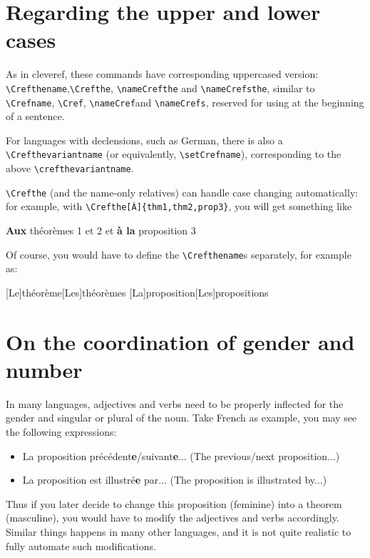 \documentclass[classical]{einfart}
\newenvironment{demo}
  {%
    \LocallyStopLineNumbers%
    \begin{tcolorbox}[enhanced jigsaw,pad at break*=1mm,breakable,
        left=2.5mm,right=3mm,top=0.5mm,bottom=0mm,
        colback=gray!5!paper,boxrule=0pt,frame hidden,
        borderline west={1.2mm}{0mm}{gray!55!paper},arc=.7mm]%
  }
  {%
    \end{tcolorbox}%
    \ResumeLineNumbers%
  }
\begin{document}
\section{Regarding the upper and lower cases}

As in \textsf{cleveref}, these commands have corresponding uppercased version: \lstinline|\Crefthename|,\linebreak \lstinline|\Crefthe|, \lstinline|\nameCrefthe| and \lstinline|\nameCrefsthe|, similar to \lstinline|\Crefname|, \lstinline|\Cref|, \lstinline|\nameCref|\linebreak and \lstinline|\nameCrefs|, reserved for using at the beginning of a sentence.

For languages with declensions, such as German, there is also a \lstinline|\Crefthevariantname| (or equivalently, \lstinline|\setCrefname|), corresponding to the above \lstinline|\crefthevariantname|.

\lstinline|\Crefthe| (and the name-only relatives) can handle case changing automatically: for example, with \lstinline|\Crefthe[À]{thm1,thm2,prop3}|, you will get something like

\begin{demo}
    \textbf{Aux} théorèmes 1 et 2 et \textbf{à la} proposition 3
\end{demo}

Of course, you would have to define the \lstinline|\Crefthename|s separately, for example as:

\begin{code}
[Le]{théorème}[Les]{théorèmes}
[La]{proposition}[Les]{propositions}
\end{code}

\section{On the coordination of gender and number}

In many languages, adjectives and verbs need to be properly inflected for the gender and singular or plural of the noun. Take French as example, you may see the following expressions:
\begin{itemize}
    \item La proposition précédent\textbf{e}/suivant\textbf{e}... (The previous/next proposition...)
    \item La proposition est illustré\textbf{e} par... (The proposition is illustrated by...)
\end{itemize}
Thus if you later decide to change this proposition (feminine) into a theorem (masculine), you would have to modify the adjectives and verbs accordingly. Similar things happens in many other languages, and it is not quite realistic to fully automate such modifications.
\end{document}
